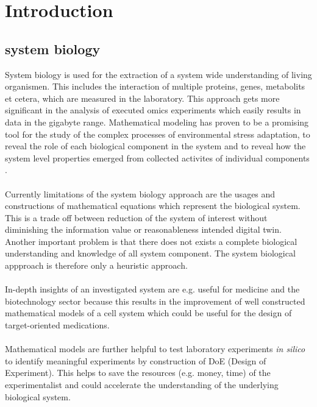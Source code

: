 



\section{Introduction}
\pagestyle{headings}


\subsection{system biology}
System biology is used for the extraction of a system wide understanding of living organismen. This includes the interaction of multiple proteins, genes, metabolits et cetera, which are measured in the laboratory. This approach gets more significant in the analysis of executed omics experiments which easily results in data in the gigabyte range. Mathematical modeling has proven to be a promising tool for the study of the complex processes of environmental stress adaptation, to reveal the role of each biological component in the system and to reveal how the system level properties emerged from collected activites of individual components \cite{Ke_2013}. \\\\
Currently limitations of the system biology approach are the usages and constructions of mathematical equations which represent the biological system. This is a trade off between reduction of the system of interest without diminishing the information value or reasonableness intended digital twin. Another important problem is that there does not exists a complete biological understanding and knowledge of all system component. The system biological appproach is therefore only a heuristic approach. \\\\
In-depth insights of an investigated system are e.g. useful for medicine and the biotechnology sector \cite{Ghosh2013} because this results in the improvement of well constructed mathematical models of a cell system which could be useful for the design of target-oriented medications. \\\\
Mathematical models are further helpful to test laboratory experiments \textit{in silico} to identify meaningful experiments by construction of DoE (Design of Experiment). This helps to save the resources (e.g. money, time) of the experimentalist and could accelerate the understanding of the underlying biological system.

